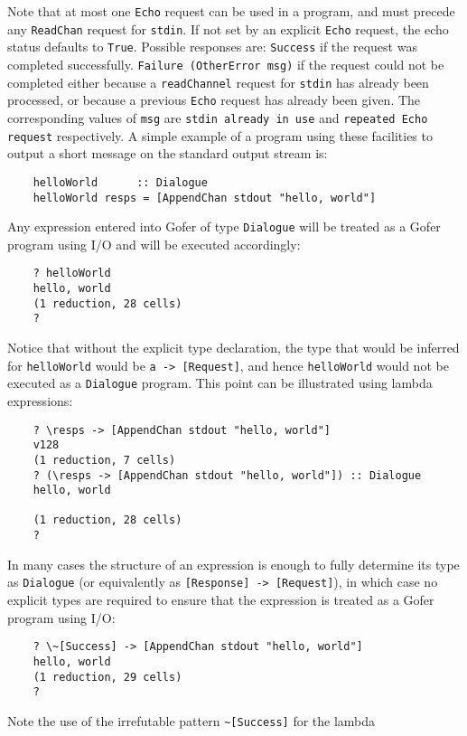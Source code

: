      Note that at most one \verb"Echo" request can be used in a  program,  and
     must precede any \verb"ReadChan" request for \verb"stdin". 
     If  not  set  by  an
     explicit \verb"Echo" request, 
     the echo status defaults to \verb"True".  Possible
     responses are:
     \BI
     \IT  \verb"Success" if the request was completed successfully.
     \IT  \verb"Failure (OtherError msg)"  if  the  request  could  not   be
          completed either because a \verb"readChannel" request for 
          \verb"stdin" has
          already been processed, or because a  previous  \verb"Echo" request
          has already been given.  The  corresponding  values of  \verb"msg"
          are   {\tt stdin already in use}   and
          {\tt repeated Echo request}
          respectively.
     \EI
\EI
A simple example of a program using these facilities to output a short
message on the standard output stream is:
\begin{verbatim}
    helloWorld      :: Dialogue
    helloWorld resps = [AppendChan stdout "hello, world"]
\end{verbatim} 
Any expression entered into Gofer of type \verb"Dialogue" will be treated as
a Gofer program using I/O and will be executed accordingly:
\begin{verbatim}
    ? helloWorld
    hello, world
    (1 reduction, 28 cells)
    ?
\end{verbatim}
Notice that without the explicit type declaration, the type that  would
be inferred for \verb"helloWorld" would  
be  \verb"a -> [Request]",  and  hence
\verb"helloWorld" would not be executed as a \verb"Dialogue" program.  This point can
be illustrated using lambda expressions:
\begin{verbatim}
    ? \resps -> [AppendChan stdout "hello, world"]
    v128
    (1 reduction, 7 cells)
    ? (\resps -> [AppendChan stdout "hello, world"]) :: Dialogue
    hello, world
 
    (1 reduction, 28 cells)
    ? 
\end{verbatim}
In many cases the  structure  of  an  expression  is  enough  to  fully
determine its type  as  \verb"Dialogue" (or  equivalently  as  
\verb"[Response] -> [Request]"), 
in which case no explicit types are required to ensure that
the expression is treated as a Gofer program using I/O:
\begin{verbatim}
    ? \~[Success] -> [AppendChan stdout "hello, world"]
    hello, world
    (1 reduction, 29 cells)
    ?
\end{verbatim}
Note the use of the  irrefutable  pattern  \verb"~[Success]"  for  the  lambda
